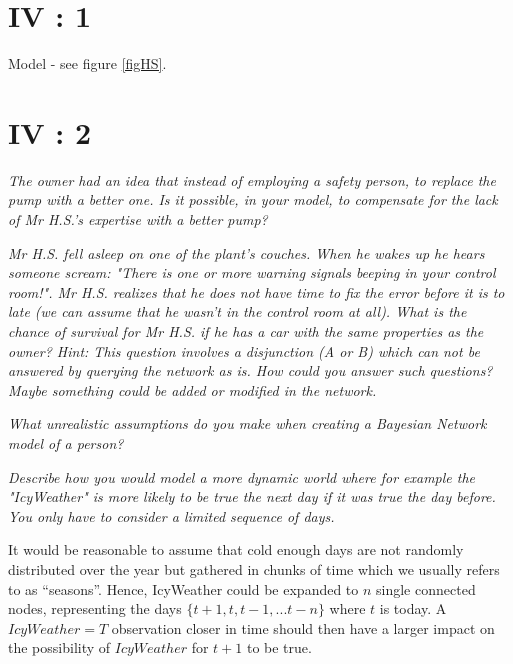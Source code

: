 \section{IV : 1}
Model - see figure \ref{figHS}.


\section{IV : 2}
\begin{framed}\em The owner had an idea that instead of employing a safety person, to replace the pump with a better one. Is it possible, in your model, to compensate for the lack of Mr H.S.'s expertise with a better pump?\em \end{framed}


\begin{framed}\em Mr H.S. fell asleep on one of the plant's couches. When he wakes up he hears someone scream: "There is one or more warning signals beeping in your control room!". Mr H.S. realizes that he does not have time to fix the error before it is to late (we can assume that he wasn't in the control room at all). What is the chance of survival for Mr H.S. if he has a car with the same properties as the owner? Hint: This question involves a disjunction (A or B) which can not be answered by querying the network as is. How could you answer such questions? Maybe something could be added or modified in the network.\em\end{framed}


\begin{framed}\em What unrealistic assumptions do you make when creating a Bayesian Network model of a person?\em\end{framed}



\begin{framed}\em Describe how you would model a more dynamic world where for example the "IcyWeather" is more likely to be true the next day if it was true the day before. You only have to consider a limited sequence of days.\em\end{framed}

It would be reasonable to assume that cold enough days are not randomly distributed over the year but gathered in chunks of time which we usually refers to as ``seasons''. Hence, IcyWeather could be expanded to $n$ single connected nodes, representing the days $\{t+1, t, t-1, ... t-n\}$ where $t$ is today. A $IcyWeather=T$ observation closer in time should then have a larger impact on the possibility of $IcyWeather$ for $t+1$ to be true.
